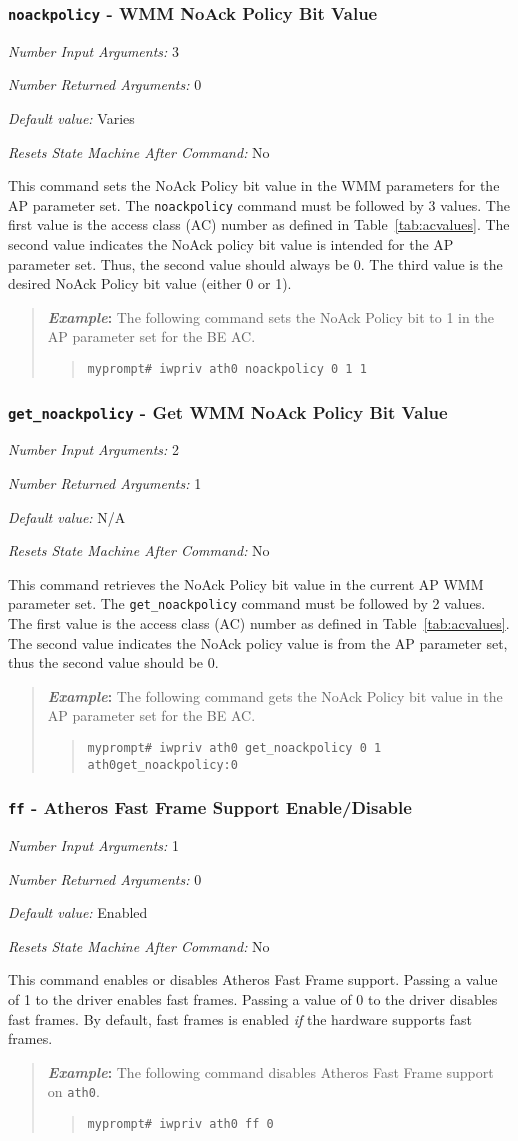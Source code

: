 \documentclass[10pt,fullpage]{article}
\newcommand{\mytt}[1]{{\texttt{#1}}}
\newcommand{\bv}{\begin{verse}}
\newcommand{\ev}{\end{verse}}
\newcommand{\cmd}[1]{{\texttt{myprompt\# #1}}}
\newcommand{\argdesc}[4]{\begin{description}
\itemsep -6pt
\item \textit{Number Input Arguments:} #1
\item \textit{Number Returned Arguments:} #2
\item \textit{Default value:} #3
\item \textit{Resets State Machine After Command:} #4
\end{description}
}
\newenvironment{example}{\begin{quote}\textbf{\textit{Example}:}}{\end{quote}}
\begin{document}
\subsubsection{\mytt{noackpolicy} - WMM NoAck Policy Bit Value}
\argdesc{3}{0}{Varies}{No}
This command sets the NoAck Policy bit value in the WMM parameters for
the AP parameter set.  The \mytt{noackpolicy} command must be followed
by 3 values.  The first value is the access class (AC) number as
defined in Table~\ref{tab:acvalues}.  The second value indicates the
NoAck policy bit value is intended for the AP parameter set.  Thus,
the second value should always be 0.  The third value is the desired
NoAck Policy bit value (either 0 or 1).
\begin{example}
  The following command sets the NoAck Policy bit to 1 in the AP
  parameter set for the BE AC.
  \bv
  \cmd{iwpriv ath0 noackpolicy 0 1 1}
  \ev
\end{example}

\subsubsection{\mytt{get\_noackpolicy} - Get WMM NoAck Policy Bit Value}
\argdesc{2}{1}{N/A}{No}
This command retrieves the NoAck Policy bit value in the current AP
WMM parameter set.  The \mytt{get\_noackpolicy} command must be
followed by 2 values.  The first value is the access class (AC) number
as defined in Table~\ref{tab:acvalues}.  The second value indicates
the NoAck policy value is from the AP parameter set, thus the second
value should be 0.
\begin{example}
  The following command gets the NoAck Policy bit value in the AP
  parameter set for the BE AC.
  \bv
  \cmd{iwpriv ath0 get\_noackpolicy 0 1}\\
  \mytt{ath0\hspace{32pt}get\_noackpolicy:0}
  \ev
\end{example}

\subsubsection{\mytt{ff} - Atheros Fast Frame Support Enable/Disable}
\argdesc{1}{0}{Enabled}{No}
This command enables or disables Atheros Fast Frame support. Passing a
value of 1 to the driver enables fast frames. Passing a value of 0 to
the driver disables fast frames.  By default, fast frames is enabled
\emph{if} the hardware supports fast frames.
\begin{example}
The following command disables Atheros Fast Frame support on
\mytt{ath0}.
\bv
\cmd{iwpriv ath0 ff 0}
\ev
\end{example}
\end{document}
